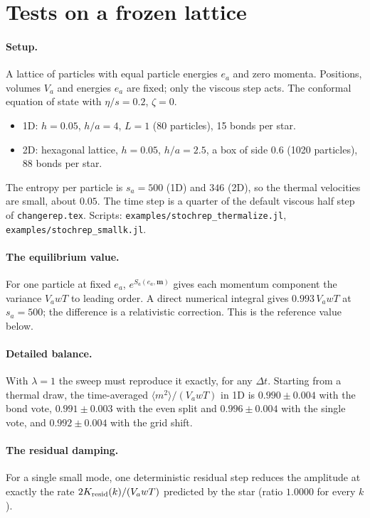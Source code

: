 \documentclass[11pt,aps,preprint,nofootinbib,superscriptaddress,tightenlines]{revtex4-2}
\newcommand{\avg}[1]{\langle #1\rangle}
\let\oldparagraph\paragraph
\renewcommand{\paragraph}{\par\bigskip\oldparagraph}
\begin{document}
\section{Tests on a frozen lattice}
\label{sec:tests}

\paragraph{Setup.}  A lattice of particles with equal particle energies $e_a$
and zero momenta.  Positions, volumes $V_a$ and energies $e_a$ are fixed; only the
viscous step acts.  The conformal equation of state with $\eta/s=0.2$, $\zeta=0$.
\begin{itemize}
\item 1D: $h=0.05$, $h/a=4$, $L=1$ (80 particles), 15 bonds per star.
\item 2D: hexagonal lattice, $h=0.05$, $h/a=2.5$, a box of side $0.6$ (1020
  particles), 88 bonds per star.
\end{itemize}
The entropy per particle is $s_a=500$ (1D) and $346$ (2D), so the thermal
velocities are small, about $0.05$.  The time step is a quarter of the default
viscous half step of \texttt{changerep.tex}.  Scripts:
\texttt{examples/stochrep\_thermalize.jl}, \texttt{examples/stochrep\_smallk.jl}.

\paragraph{The equilibrium value.}  For one particle at fixed $e_a$, $e^{S_a(e_a,\bm m)}$
gives each momentum component the variance $V_awT$ to leading order.  A direct
numerical integral gives $0.993\,V_awT$ at $s_a=500$; the difference is a
relativistic correction.  This is the reference value below.

\paragraph{Detailed balance.}  With $\lambda=1$ the sweep must reproduce it
exactly, for any $\Delta t$.  Starting from a thermal draw, the time-averaged
$\avg{m^2}/(V_awT)$ in 1D is $0.990\pm0.004$ with the bond vote,
$0.991\pm0.003$ with the even split and $0.996\pm0.004$ with the single vote, and
$0.992\pm0.004$ with the grid shift.

\paragraph{The residual damping.}  For a single small mode, one deterministic
residual step reduces the amplitude at exactly the rate
$2K_{\rm resid}(k)/(V_awT)$ predicted by the star (ratio $1.0000$ for every $k$).
\end{document}
